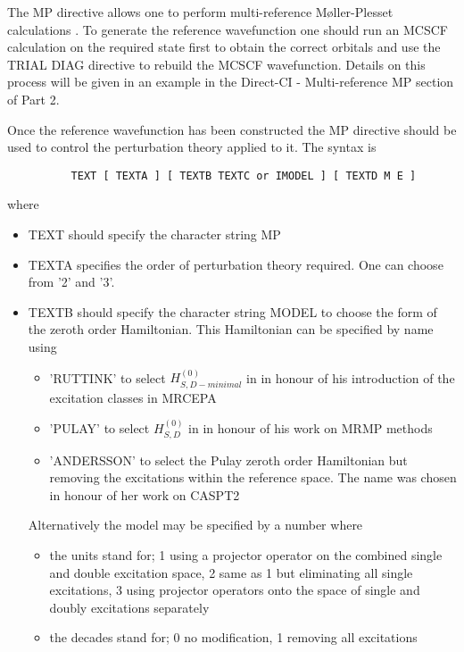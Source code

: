 \documentclass[11pt,fleqn]{article}
\begin{document}
The MP directive allows one to perform multi-reference M{\o}ller-Plesset
calculations \cite{ref:48,ref:49,ref:50}. To generate the reference wavefunction
one should run an MCSCF calculation on the required state first to obtain the
correct orbitals and use the TRIAL DIAG directive to rebuild the MCSCF 
wavefunction. Details on this process will be given in an example in the
Direct-CI - Multi-reference MP section of Part 2.

Once the reference wavefunction
has been constructed the MP directive should be used to control the perturbation
theory applied to it. The syntax is
{
\footnotesize
\begin{verbatim}
          TEXT [ TEXTA ] [ TEXTB TEXTC or IMODEL ] [ TEXTD M E ]
\end{verbatim}
}
where
\begin{itemize}
\item TEXT should specify the character string MP
\item TEXTA specifies the order of perturbation theory required. One can choose
      from '2' and '3'. 
\item TEXTB should specify the character string MODEL to choose the form of
      the zeroth order Hamiltonian. This Hamiltonian can be specified by name
      using 
      \begin{itemize}
      \item 'RUTTINK' to select $H^{(0)}_{S,D-minimal}$ in \cite{ref:48}
            in honour of his introduction of the excitation classes in MRCEPA
            \cite{ref:51}
      \item 'PULAY' to select $H^{(0)}_{S,D}$ in \cite{ref:48} in honour
            of his work on MRMP methods \cite{ref:50}
      \item 'ANDERSSON' to select the Pulay zeroth order Hamiltonian but 
            removing the excitations within the reference space. The name was
            chosen in honour of her work on CASPT2 \cite{ref:52}
      \end{itemize}
      Alternatively the model may be specified by a number where
      \begin{itemize}
      \item the units stand for; 1 using a projector operator on the combined
            single and double excitation space, 2 same as 1 but eliminating
            all single excitations, 3 using projector operators onto the space
            of single and doubly excitations separately
      \item the decades stand for; 0 no modification, 1 removing all excitations

\end{itemize}
\end{itemize}
\end{document}

